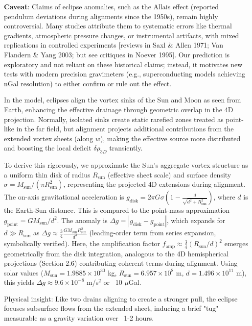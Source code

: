 \documentclass{article}
\begin{document}
\textbf{Caveat}: Claims of eclipse anomalies, such as the Allais effect (reported pendulum deviations during alignments since the 1950s), remain highly controversial. Many studies attribute them to systematic errors like thermal gradients, atmospheric pressure changes, or instrumental artifacts, with mixed replications in controlled experiments [reviews in Saxl \& Allen 1971; Van Flandern \& Yang 2003; but see critiques in Noever 1995]. Our prediction is exploratory and not reliant on these historical claims; instead, it motivates new tests with modern precision gravimeters (e.g., superconducting models achieving nGal resolution) to either confirm or rule out the effect.

In the model, eclipses align the vortex sinks of the Sun and Moon as seen from Earth, enhancing the effective drainage through geometric overlap in the 4D projection. Normally, isolated sinks create static rarefied zones treated as point-like in the far field, but alignment projects additional contributions from the extended vortex sheets (along $w$), making the effective source more distributed and boosting the local deficit $\delta \rho_{3D}$ transiently.

To derive this rigorously, we approximate the Sun's aggregate vortex structure as a uniform thin disk of radius $R_\text{sun}$ (effective sheet scale) and surface density $\sigma = M_\text{sun} / (\pi R_\text{sun}^2)$, representing the projected 4D extensions during alignment. The on-axis gravitational acceleration is $g_{\text{disk}} = 2 \pi G \sigma \left(1 - \frac{d}{\sqrt{d^2 + R_\text{sun}^2}}\right)$, where $d$ is the Earth-Sun distance. This is compared to the point-mass approximation $g_{\text{point}} = G M_\text{sun} / d^2$. The anomaly is $\Delta g = |g_{\text{disk}} - g_{\text{point}}|$, which expands for $d \gg R_\text{sun}$ as $\Delta g \approx \frac{3}{4} \frac{G M_\text{sun} R_\text{sun}^2}{d^4}$ (leading-order term from series expansion, symbolically verified). Here, the amplification factor $f_{\text{amp}} \approx \frac{3}{4} (R_\text{sun}/d)^2$ emerges geometrically from the disk integration, analogous to the 4D hemispherical projections (Section 2.6) contributing coherent terms during alignment. Using solar values ($M_\text{sun} = 1.9885 \times 10^{30}$ kg, $R_\text{sun} = 6.957 \times 10^8$ m, $d = 1.496 \times 10^{11}$ m), this yields $\Delta g \approx 9.6 \times 10^{-8}$ m/s$^2$ or ~10 $\mu$Gal.

Physical insight: Like two drains aligning to create a stronger pull, the eclipse focuses subsurface flows from the extended sheet, inducing a brief "tug" measurable as a gravity variation over ~1-2 hours.
\end{document}
